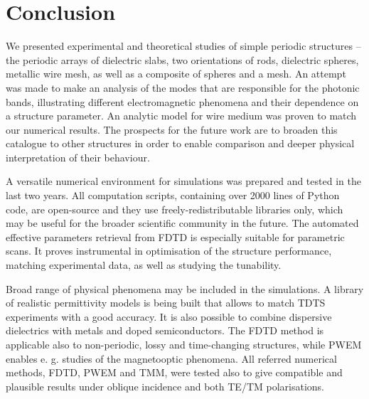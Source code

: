 \documentclass[letterpaper,12pt]{report}
\begin{document}


\chapter{Conclusion}
We presented experimental and theoretical studies of simple periodic structures -- the periodic arrays of dielectric slabs, two orientations of rods, dielectric spheres, metallic wire mesh, as well as a composite of spheres and a mesh. An attempt was made to make an analysis of the modes that are responsible for the photonic bands, illustrating different electromagnetic phenomena and their dependence on a structure parameter. An analytic model for wire medium was proven to match our numerical results.
The prospects for the future work are to broaden this catalogue to other structures in order to enable comparison and deeper physical interpretation of their behaviour. 


A versatile numerical environment for simulations was prepared and tested in the last two years. All computation scripts, containing over 2000 lines of Python code, are open-source and they use freely-redistributable libraries only, which may be useful for the broader scientific community in the future. 
The automated effective parameters retrieval from FDTD is especially suitable for parametric scans. It proves instrumental in optimisation of the structure performance, matching experimental data, as well as studying the tunability.

Broad range of physical phenomena may be included in the simulations. A library of realistic permittivity models is being built that allows to match TDTS experiments with a good accuracy. It is also possible to combine dispersive dielectrics with metals and doped semiconductors. 
 The FDTD method is applicable also to non-periodic, lossy and time-changing structures, while PWEM enables e. g. studies of the magnetooptic phenomena.
All referred numerical methods, FDTD, PWEM and TMM, were tested also to give compatible and plausible results under oblique incidence and both TE/TM polarisations. 
\end{document}
